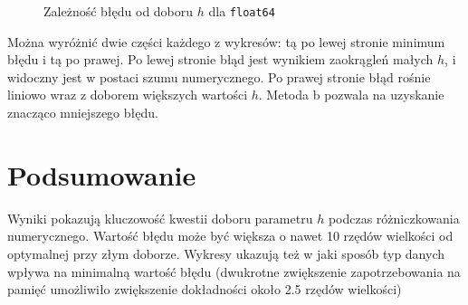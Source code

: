 \documentclass[11pt]{extarticle}
\begin{document}
	\begin{figure}[H]
		\begin{center}
			
		\end{center}
		\caption{Zależność błędu od doboru \( h \) dla \texttt{float64}}
		\label{rys_f63}
	\end{figure}

	\pagebreak

	Można wyróżnić dwie części każdego z wykresów: tą po lewej stronie minimum błędu i tą po prawej.
	Po lewej stronie błąd jest wynikiem zaokrągleń małych \( h \), i widoczny jest w postaci szumu numerycznego.
	Po prawej stronie błąd rośnie liniowo wraz z doborem większych wartości \( h \).
	Metoda b pozwala na uzyskanie znacząco mniejszego błędu.


	\section{Podsumowanie}
	
	Wyniki pokazują kluczowość kwestii doboru parametru \( h \) podczas różniczkowania numerycznego.
	Wartość błędu może być większa o nawet 10 rzędów wielkości od optymalnej przy złym doborze.
	Wykresy ukazują też w jaki sposób typ danych wpływa na minimalną wartość błędu (dwukrotne zwiększenie zapotrzebowania na pamięć umożliwiło zwiększenie dokładności około 2.5 rzędów wielkości)
\end{document}
